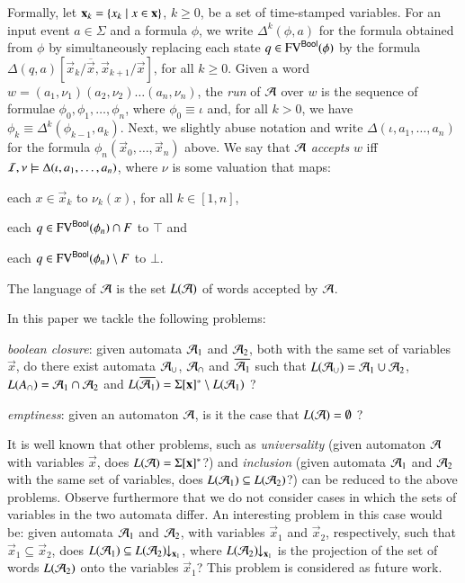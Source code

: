 \documentclass[10pt,conference,letterpaper,twocolumn]{IEEEtran}
\begin{document}
Formally, let $\mathbf x_k = \left\{ x_k \mid x \in \mathbf x \right\}$, $k\geq0$, be
a set of time-stamped variables. For an input event $a \in \Sigma$ and
a formula $\phi$, we write $\Delta^k(\phi,a)$ for the formula obtained
from $\phi$ by simultaneously replacing each state $q \in
\mathrm{FV}^{\mathsf{Bool}}(\phi)$ by the formula
$\Delta(q,a)[\vec{x}_k/\overline{\vec{x}},\vec{x}_{k+1}/\vec{x}]$, for
all $k\geq0$. Given a word $w = (a_1,\nu_1)(a_2,\nu_2) \ldots
(a_n,\nu_n)$, the \emph{run} of $\mathcal{A}$ over $w$ is the sequence of
formulae $\phi_0,\phi_1,\ldots,\phi_n$, where $\phi_0 \equiv \iota$
and, for all $k > 0$, we have $\phi_k \equiv
\Delta^k(\phi_{k-1},a_k)$. Next, we slightly abuse notation and write
$\Delta(\iota,a_1,\ldots,a_n)$ for the formula
$\phi_n(\vec{x}_0,\ldots,\vec{x}_n)$ above. We say that $\mathcal{A}$
\emph{accepts} $w$ iff $\mathcal{I},\nu \models \Delta(\iota,a_1,\ldots,a_n)$,
where $\nu$ is some valuation that maps:\begin{inparaenum}[(1)]
%
\item each $x \in \vec{x}_k$ to $\nu_k(x)$, for all $k\in[1,n]$, 
%
\item each $q \in \mathrm{FV}^{\mathsf{Bool}}(\phi_n) \cap F$ to $\top$ and 
%
\item each $q \in \mathrm{FV}^{\mathsf{Bool}}(\phi_n) \setminus F$ to $\bot$.
\end{inparaenum}
The language of $\mathcal{A}$ is the set $L(\mathcal{A})$ of words accepted by $\mathcal{A}$.

In this paper we tackle the following problems: \begin{compactenum}
\item \emph{boolean closure}: given automata $\mathcal{A}_1$ and $\mathcal{A}_2$, both
  with the same set of variables $\vec{x}$, do there exist automata
  $\mathcal{A}_\cup$, $\mathcal{A}_\cap$ and $\overline{\mathcal{A}_1}$ such that $L(\mathcal{A}_\cup) =
  \mathcal{A}_1 \cup \mathcal{A}_2$, $L(A_\cap) = \mathcal{A}_1 \cap \mathcal{A}_2$ and
  $L(\overline{\mathcal{A}_1}) = \Sigma[\mathbf x]^* \setminus L(\mathcal{A}_1)$ ?
%
\item \emph{emptiness}: given an automaton $\mathcal{A}$, is it the case that
  $L(\mathcal{A}) = \emptyset$ ?
\end{compactenum}

It is well known that other problems, such as \emph{universality}
(given automaton $\mathcal{A}$ with variables $\vec{x}$, does $L(\mathcal{A}) =
\Sigma[\mathbf x]^*$?) and \emph{inclusion} (given automata $\mathcal{A}_1$ and
$\mathcal{A}_2$ with the same set of variables, does $L(\mathcal{A}_1) \subseteq
L(\mathcal{A}_2)$?) can be reduced to the above problems. Observe furthermore
that we do not consider cases in which the sets of variables in the
two automata differ. An interesting problem in this case would be: given
automata $\mathcal{A}_1$ and $\mathcal{A}_2$, with variables $\vec{x}_1$ and
$\vec{x}_2$, respectively, such that $\vec{x}_1 \subseteq \vec{x}_2$,
does $L(\mathcal{A}_1) \subseteq {L(\mathcal{A}_2)}\!\!\downarrow_{{\mathbf x_1}}$, where
${L(\mathcal{A}_2)}\!\!\downarrow_{{\mathbf x_1}}$ is the projection of the set of words
$L(\mathcal{A}_2)$ onto the variables $\vec{x}_1$? This problem is considered
as future work.
\end{document}
